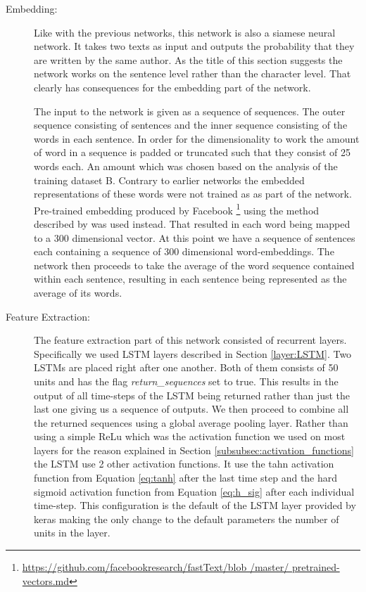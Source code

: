 \begin{description}

    \item[Embedding:]

        Like with the previous networks, this network is also a siamese neural
        network. It takes two texts as input and outputs the probability that
        they are written by the same author. As the title of this section
        suggests the network works on the sentence level rather than the
        character level. That clearly has consequences for the embedding part of
        the network.

        The input to the network is given as a sequence of sequences. The outer
        sequence consisting of sentences and the inner sequence consisting
        of the words in each sentence. In order for the dimensionality to
        work the amount of word in a sequence is padded or truncated such
        that they consist of 25 words each. An amount which was chosen based
        on the analysis of the training dataset \gls{B}. Contrary to earlier
        networks the embedded representations of these words were not trained
        as as part of the network. Pre-trained embedding produced by Facebook
        \footnote{\url{https://github.com/facebookresearch/fastText/blob
        /master/ pretrained-vectors.md}} using the method described by
        \citet{bojanowski2016enriching} was used instead. That resulted in each
        word being mapped to a 300 dimensional vector. At this point we have
        a sequence of sentences each containing a sequence of 300 dimensional
        word-embeddings. The network then proceeds to take the average of the
        word sequence contained within each sentence, resulting in each sentence
        being represented as the average of its words.

    \item[Feature Extraction:]

        The feature extraction part of this network consisted of recurrent
        layers. Specifically we used \gls{LSTM} layers described in
        Section \ref{layer:LSTM}. Two \glspl{LSTM} are placed right after
        one another. Both of them consists of 50 units and has the flag
        \textit{return\_sequences} set to true. This results in the output
        of all time-steps of the \gls{LSTM} being returned rather than just
        the last one giving us a sequence of outputs. We then proceed to
        combine all the returned sequences using a global average pooling
        layer. Rather than using a simple \gls{ReLu} which was the activation
        function we used on most layers for the reason explained in Section
        \ref{subsubsec:activation_functions} the \gls{LSTM} use 2 other
        activation functions. It use the tahn activation function from Equation
        \eqref{eq:tanh} after the last time step and the hard sigmoid activation
        function from Equation \eqref{eq:h_sig} after each individual time-step.
        This configuration is the default of the \gls{LSTM} layer provided by
        keras making the only change to the default parameters the number of
        units in the layer.


\end{description}
